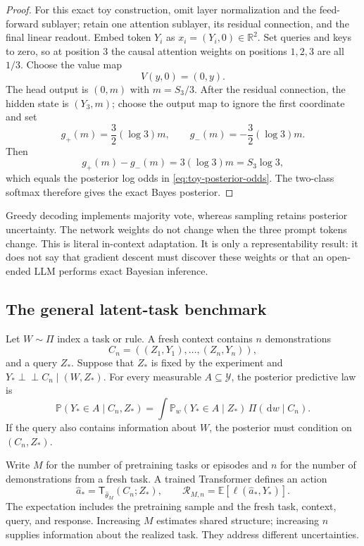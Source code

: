 \documentclass[11pt]{amsart}
\numberwithin{equation}{section}
\theoremstyle{definition}
\theoremstyle{plain}
\theoremstyle{remark}
\newcommand{\R}{\mathbb{R}}
\newcommand{\E}{\mathbb{E}}
\newcommand{\Prob}{\mathbb{P}}
\newcommand{\cR}{\mathcal{R}}
\newcommand{\cY}{\mathcal{Y}}
\newcommand{\dd}{\,\mathrm{d}}
\begin{document}
\begin{proof}
For this exact toy construction, omit layer normalization and the
feed-forward sublayer; retain one attention sublayer, its residual connection,
and the final linear readout.
Embed token $Y_i$ as $x_i=(Y_i,0)\in\R^2$.  Set queries and keys to zero, so at
position $3$ the causal attention weights on positions $1,2,3$ are all $1/3$.
Choose the value map
\[
 V(y,0)=(0,y).
\]
The head output is $(0,m)$ with $m=S_3/3$.  After the residual connection, the
hidden state is $(Y_3,m)$; choose the output map to ignore the first coordinate
and set
\[
 g_+(m)=\frac32(\log3)m,
 \qquad
 g_-(m)=-\frac32(\log3)m.
\]
Then
\[
 g_+(m)-g_-(m)=3(\log3)m=S_3\log3,
\]
which equals the posterior log odds in \eqref{eq:toy-posterior-odds}.  The
two-class softmax therefore gives the exact Bayes posterior.
\end{proof}

Greedy decoding implements majority vote, whereas sampling retains posterior
uncertainty.  The network weights do not change when the three prompt tokens
change.  This is literal in-context adaptation.  It is only a representability
result: it does not say that gradient descent must discover these weights or
that an open-ended LLM performs exact Bayesian inference.

\subsection{The general latent-task benchmark}

Let $W\sim\Pi$ index a task or rule.  A fresh context contains $n$
demonstrations
\[
 C_n=((Z_1,Y_1),\ldots,(Z_n,Y_n)),
\]
and a query $Z_*$.  Suppose that $Z_*$ is fixed by the experiment and
$Y_*\mathrel{\perp\!\!\!\perp}C_n\mid(W,Z_*)$.  For every measurable
$A\subseteq\cY$, the posterior predictive law is
\begin{equation}\label{eq:general-posterior-predictive}
 \Prob(Y_*\in A\mid C_n,Z_*)
 =\int
   \Prob_w(Y_*\in A\mid Z_*)\,
   \Pi(\dd w\mid C_n).
\end{equation}
If the query also contains information about $W$, the posterior must condition
on $(C_n,Z_*)$.

Write $M$ for the number of pretraining tasks or episodes and $n$ for the
number of demonstrations from a fresh task.  A trained Transformer defines an
action
\begin{equation}\label{eq:icl-action-risk}
 \widehat a_*
 =\mathsf T_{\widehat\theta_M}(C_n;Z_*),
 \qquad
 \cR_{M,n}
 =\E\!\left[
   \ell(\widehat a_*,Y_*)
 \right].
\end{equation}
The expectation includes the pretraining sample and the fresh task, context,
query, and response.  Increasing $M$ estimates shared structure; increasing
$n$ supplies information about the realized task.  They address different
uncertainties.
\end{document}
